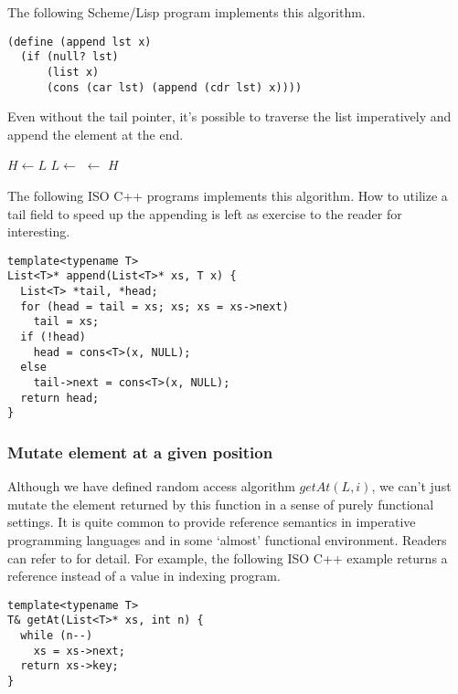 \documentclass[b5paper]{article}
\begin{document}
The following Scheme/Lisp program implements this algorithm.

\lstset{language=Lisp}
\begin{lstlisting}
(define (append lst x)
  (if (null? lst)
      (list x)
      (cons (car lst) (append (cdr lst) x))))
\end{lstlisting}

Even without the tail pointer, it's possible to traverse the list imperatively and append the element at the end.

\begin{algorithmic}[1]
    \State \Return {}
  \EndIf
  \State $H \gets L$
    \State $L \gets$ 
  \EndWhile
  \State {} $\gets$ 
  \State \Return $H$
\EndFunction
\end{algorithmic}

The following ISO C++ programs implements this algorithm. How to utilize a tail field to speed up the appending
is left as exercise to the reader for interesting.

\lstset{language=C++}
\begin{lstlisting}
template<typename T>
List<T>* append(List<T>* xs, T x) {
  List<T> *tail, *head;
  for (head = tail = xs; xs; xs = xs->next)
    tail = xs;
  if (!head)
    head = cons<T>(x, NULL);
  else
    tail->next = cons<T>(x, NULL);
  return head;
}
\end{lstlisting}

\subsubsection{Mutate element at a given position}
Although we have defined random access algorithm $getAt(L, i)$, we can't just mutate the element returned
by this function in a sense of purely functional settings. It is quite common to provide reference semantics
in imperative programming languages and in some `almost' functional environment. Readers can refer to \cite{mittype}
for detail. For example, the following ISO C++ example returns a reference instead of a value in indexing program.

\lstset{language=C++}
\begin{lstlisting}
template<typename T>
T& getAt(List<T>* xs, int n) {
  while (n--)
    xs = xs->next;
  return xs->key;
}
\end{lstlisting}
\end{document}
